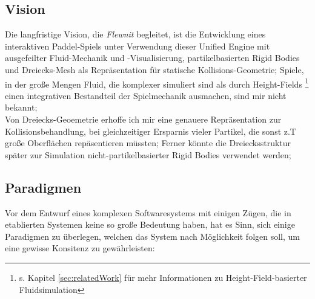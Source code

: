 
\subsection{Vision}

Die langfristige Vision, die \emph{Flewnit} begleitet, ist die Entwicklung eines interaktiven Paddel-Spiels unter Verwendung dieser Unified Engine mit ausgefeilter Fluid-Mechanik und -Visualisierung, partikelbasierten Rigid Bodies und Dreiecks-Mesh als Repräsentation für statische Kollisions-Geometrie; Spiele, in der große Mengen Fluid, die komplexer simuliert sind als durch Height-Fields
\footnote{s. Kapitel \ref{sec:relatedWork} für mehr Informationen zu Height-Field-basierter Fluidsimulation}
einen integrativen Bestandteil der Spielmechanik ausmachen, sind mir nicht bekannt;\\
Von Dreiecks-Geoemetrie erhoffe ich mir eine genauere Repräsentation zur Kollisionsbehandlung, bei gleichzeitiger Ersparnis vieler Partikel, die sonst z.T große Oberflächen repäsentieren müssten; Ferner könnte die Dreiecksstruktur später zur Simulation nicht-partikelbasierter Rigid Bodies verwendet werden;


\subsection{Paradigmen}
\label{sec:paradigm}

Vor dem Entwurf eines komplexen Softwaresystems mit einigen Zügen, die in etablierten Systemen keine so große Bedeutung haben, hat es Sinn, sich einige Paradigmen zu überlegen, welchen das System nach Möglichkeit folgen soll, um eine gewisse Konsitenz zu gewährleisten:
	
